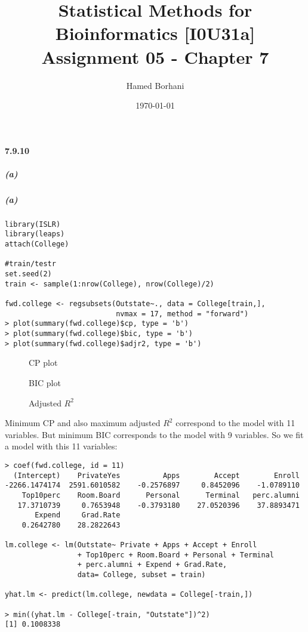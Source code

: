 \documentclass[11pt]{article}
\title{\textbf{Statistical Methods for Bioinformatics [I0U31a] \\Assignment 05 - Chapter 7}}
\author{Hamed Borhani}
\date{\today}
\begin{document}
\lstset{language=R, breaklines=true, basicstyle=\footnotesize} 

\maketitle

\newpage
\paragraph{7.9.10 }

\subparagraph{(a)}
\subparagraph{(a)}
\begin{lstlisting}
library(ISLR)
library(leaps)
attach(College)

#train/testr
set.seed(2)
train <- sample(1:nrow(College), nrow(College)/2)

fwd.college <- regsubsets(Outstate~., data = College[train,], 
                          nvmax = 17, method = "forward")
> plot(summary(fwd.college)$cp, type = 'b')
> plot(summary(fwd.college)$bic, type = 'b')
> plot(summary(fwd.college)$adjr2, type = 'b')
\end{lstlisting}

\begin{figure}[H]
\centering

\caption{CP plot}
\label{}
\end{figure}
\begin{figure}[H]
\centering

\caption{BIC plot}
\label{}
\end{figure}
\begin{figure}[H]
\centering

\caption{Adjusted $R^2$}
\label{}
\end{figure}
Minimum CP and also maximum adjusted $R^2$ correspond to the model with 11 variables. But minimum BIC corresponds to the model with 9 variables. So we fit a model with this 11 variables:
\begin{lstlisting}
> coef(fwd.college, id = 11)
  (Intercept)    PrivateYes          Apps        Accept        Enroll 
-2266.1474174  2591.6010582    -0.2576897     0.8452096    -1.0789110 
    Top10perc    Room.Board      Personal      Terminal   perc.alumni 
   17.3710739     0.7653948    -0.3793180    27.0520396    37.8893471 
       Expend     Grad.Rate 
    0.2642780    28.2822643

lm.college <- lm(Outstate~ Private + Apps + Accept + Enroll 
                 + Top10perc + Room.Board + Personal + Terminal 
                 + perc.alumni + Expend + Grad.Rate, 
                 data= College, subset = train)

yhat.lm <- predict(lm.college, newdata = College[-train,])

> min((yhat.lm - College[-train, "Outstate"])^2)
[1] 0.1008338
\end{lstlisting}
\end{document}

